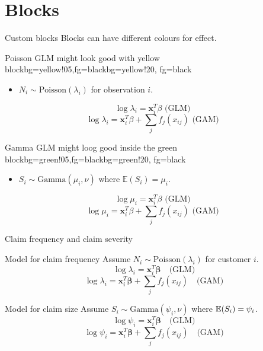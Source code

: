 \section{Blocks}

\begin{frame}{Custom blocks}
	Blocks can have different colours for effect.
	\begin{myblock}{Poisson GLM might look good with yellow block}{bg=yellow!05,fg=black}{bg=yellow!20, fg=black}
		\begin{itemize}
			\item $N_i\sim \text{Poisson}(\lambda_i)$ for observation $i$.
		\end{itemize}
		$$ \log \lambda_i = \mathbf{x}_i^T\beta \text{ (GLM) } $$
		$$ \log \lambda_i = \mathbf{x}_i^T\beta + \sum_j f_j(x_{ij}) \text{ (GAM) } $$
	\end{myblock}
	\begin{myblock}{Gamma GLM might loog good inside the green block}{bg=green!05,fg=black}{bg=green!20, fg=black}
		\begin{itemize}
			\item $S_i\sim \text{Gamma}(\mu_i,\nu)$ where $\mathbb{E}(S_i)=\mu_i$.
		\end{itemize}
		$$ \log \mu_i = \mathbf{x}_i^T\beta \text{ (GLM) } $$
		$$ \log \mu_i = \mathbf{x}_i^T\beta + \sum_j f_j(x_{ij}) \text{ (GAM) } $$
	\end{myblock}
\end{frame}

\begin{frame}[fragile, t]{Claim frequency and claim severity}
	\vspace{-2.5em}
	\begin{block}{Model for claim frequency}
		Assume $N_i \sim \text{Poisson}(\lambda_i)$ for customer $i$. 
		$$ \log \lambda_i = \bm{x}_i^T \bm{\beta} \quad \text{(GLM)}$$
		$$ \log \lambda_i = \bm{x}_i^T \bm{\beta} + \sum_j f_j(x_{ij}) \quad \text{(GAM)}$$
		
	\end{block} 
	
	\begin{exampleblock}{Model for claim size}
		Assume $S_i \sim \text{Gamma}(\psi_i, \nu)$ where $\mathbb{E}(S_i) = \psi_i$.
		$$ \log \psi_i = \bm{x}_i^T \bm{\beta} \quad \text{(GLM)}$$
		$$ \log \psi_i = \bm{x}_i^T \bm{\beta} + \sum_j f_j(x_{ij}) \quad \text{(GAM)}$$
	\end{exampleblock}
\end{frame}

